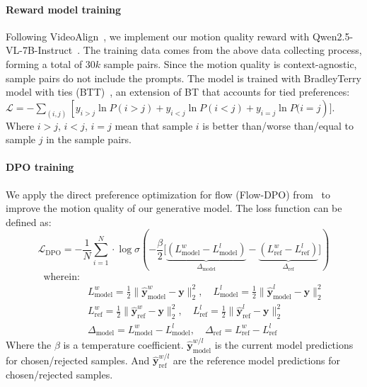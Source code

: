 \documentclass{article}
\begin{document}
{\paragraph{Reward model training}
Following VideoAlign~\cite{liu2025improving}, we implement our motion quality reward with Qwen2.5-VL-7B-Instruct~\cite{Qwen2.5-VL}. The training data comes from the above data collecting process, forming a total of $30k$ sample pairs. Since the motion quality is context-agnostic, sample pairs do not include the prompts. The model is trained with BradleyTerry model with ties (BTT)~\cite{rao1967ties}, an extension of BT that accounts for tied preferences: $\mathcal{L} = -\sum_{(i,j)} \left[ y_{i>j} \ln P(i>j) + y_{i<j} \ln P(i<j) + y_{i=j} \ln P(i=j\right)]$. Where $i>j$, $i<j$, $i=j$ mean that sample $i$ is better than/worse than/equal to sample $j$ in the sample pairs.

\paragraph{DPO training}
We apply the direct preference optimization for flow (Flow-DPO) from~\cite{liu2025improving} to improve the motion quality of our generative model. The loss function can be defined as:
\begin{equation}
\mathcal{L}_{\text{DPO}} = -\frac{1}{N} \sum_{i=1}^N \cdot \log\sigma\left( -\frac{\beta}{2} \Big[ \underbrace{(L_{\text{model}}^w - L_{\text{model}}^l)}_{\Delta_{\text{model}}} - \underbrace{(L_{\text{ref}}^w - L_{\text{ref}}^l)}_{\Delta_{\text{ref}}} \Big] \right)
\end{equation}
\begin{align*}
\text{wherein:} & \\
& L_{\text{model}}^w = \frac{1}{2}\|\mathbf{\hat{y}}_{\text{model}}^w - \mathbf{y}\|_2^2, \quad 
  L_{\text{model}}^l = \frac{1}{2}\|\mathbf{\hat{y}}_{\text{model}}^l - \mathbf{y}\|_2^2 \\
& L_{\text{ref}}^w = \frac{1}{2}\|\mathbf{\hat{y}}_{\text{ref}}^w - \mathbf{y}\|_2^2, \quad 
  L_{\text{ref}}^l = \frac{1}{2}\|\mathbf{\hat{y}}_{\text{ref}}^l - \mathbf{y}\|_2^2 \\
& \Delta_{\text{model}} = L_{\text{model}}^w - L_{\text{model}}^l, \quad 
  \Delta_{\text{ref}} = L_{\text{ref}}^w - L_{\text{ref}}^l
\end{align*}
Where the $\beta$ is a temperature coefficient. $\mathbf{\hat{y}}_{\text{model}}^{w/l}$ is the current model predictions for chosen/rejected samples. And $\mathbf{\hat{y}}_{\text{ref}}^{w/l}$ are the reference model predictions for chosen/rejected samples. 

}
\end{document}
